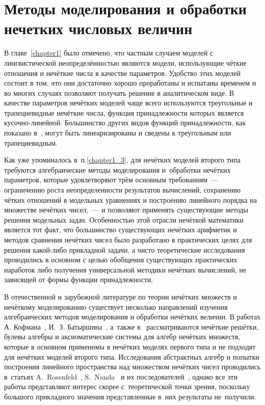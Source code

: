 \chapter{Методы моделирования и обработки нечетких числовых величин}
\label{chapter2}

В главе~\ref{chapter1} было отмечено, что частным случаем моделей с лингвистической неопределённостью являются модели, использующие чёткие отношения и нечёткие числа в качестве параметров. Удобство этих моделей состоит в том, что они достаточно хорошо проработаны и испытаны временем и во многих случаях позволяют получать решение в аналитическом виде. В качестве параметров нечётких моделей чаще всего используются треугольные и трапециевидные нечёткие числа, функция принадлежности которых является кусочно-линейной. Большинство других видов функций принадлежности, как показано в~\cite{Hanss_Engineering}, могут быть линеаризированы и сведены к треугольным или трапециевидным.

Как уже упоминалось в~п.\ref{chapter1_3}, для нечётких моделей второго типа требуются алгебраические методы моделирования и~обработки нечётких параметров, которые удовлетворяют трём основным требованиям~--- ограничению роста неопределенности результатов вычислений, сохранению чётких отношений в модельных уравнениях и построению линейного порядка на множестве нечётких чисел,~--- и позволяют применять существующие методы решения модельных задач. Особенностью этой отрасли нечёткой математики является тот факт, что большинство существующих нечётких арифметик и методов сравнения нечётких чисел было разработано в практических целях для решения какой-либо прикладной задачи, а чисто теоретические исследования проводились в основном с целью обобщения существующих практических наработок либо получения универсальной методики нечётких вычислений, не зависящей от формы функции принадлежности. 

В отечественной и зарубежной литературе по теории нечётких множеств и нечёткому моделированию существует несколько направлений изучения алгебраических методов моделирования и обработки нечётких величин. В работах А. Кофмана~\cite{Kaufmann}, И.~З. Батыршина~\cite{Batyrshin, Hybrid_Systems}, а~также в~\cite{Fuzzy_Lattices, Axioms_Fuzzy_Algebra, Philosophy_Fuzzy_Structures} рассматриваются нечёткие решётки, булевы алгебры и аксиоматические системы для алгебр нечётких множеств, которые в основном применимы в нечётких моделях первого типа и не подходят для нечётких моделей второго типа. Исследования абстрактных алгебр и попытки построения линейного пространства над множеством нечётких чисел проводились в~статьях A.~Rosenfeld~\cite{Rosenfeld_Algebras}, S.~Nanda~\cite{Fuzzy_Fields} и их последователей~\cite{Fuzzy_Fields_Revised, Commutative_Algebra, Serbia_Algebras, Kosinski}, однако все эти работы представляют интерес скорее с~теоретической точки зрения, поскольку большого прикладного значения представленные в~них результаты не~получили.

